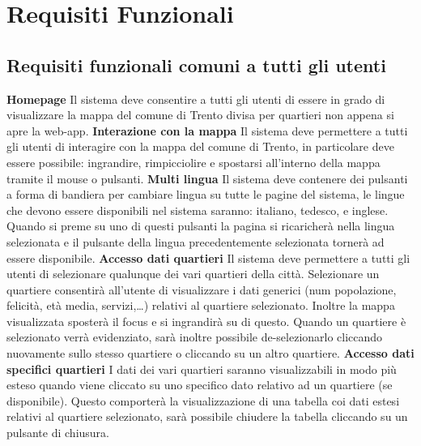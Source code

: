 \chapter{Requisiti Funzionali} 
    \section{Requisiti funzionali comuni a tutti gli utenti}
        \begin{rfList}
            \rfItem \textbf{Homepage} Il sistema deve consentire a tutti gli utenti di essere in grado di visualizzare la mappa del comune di Trento divisa per quartieri non appena si apre la web-app.
            \rfItem \textbf{Interazione con la mappa} Il sistema deve permettere a tutti gli utenti di interagire con la mappa del comune di Trento, in particolare deve essere possibile: ingrandire, rimpicciolire e spostarsi all'interno della mappa tramite il mouse o pulsanti.
            \rfItem \textbf{Multi lingua} Il sistema deve contenere dei pulsanti a forma di bandiera per cambiare lingua su tutte le pagine del sistema, le lingue che devono essere disponibili nel sistema saranno: italiano, tedesco, e inglese. Quando si preme su uno di questi pulsanti la pagina si ricaricherà nella lingua selezionata e il pulsante della lingua precedentemente selezionata tornerà ad essere disponibile.
            \rfItem \textbf{Accesso dati quartieri} Il sistema deve permettere a tutti gli utenti di selezionare qualunque dei vari quartieri della città. Selezionare un quartiere consentirà all'utente di visualizzare i dati generici (num popolazione, felicità, età media, servizi,\dots) relativi al quartiere selezionato. Inoltre la mappa visualizzata sposterà il focus e si ingrandirà su di questo. Quando un quartiere è selezionato verrà evidenziato, sarà inoltre possibile de-selezionarlo cliccando nuovamente sullo stesso quartiere o cliccando su un altro quartiere.
            \rfItem \textbf{Accesso dati specifici quartieri} I dati dei vari quartieri saranno visualizzabili in modo più esteso quando viene cliccato su uno specifico dato relativo ad un quartiere (se disponibile). Questo comporterà la visualizzazione di una tabella coi dati estesi relativi al quartiere selezionato, sarà possibile chiudere la tabella cliccando su un pulsante di chiusura. 
        \end{rfList} 
